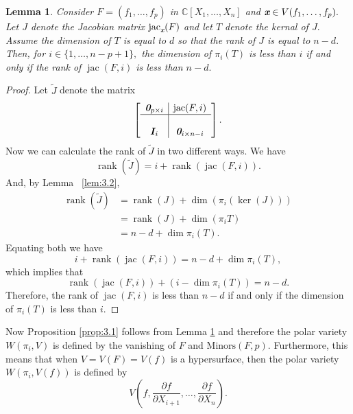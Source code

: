 \documentclass[a4paper]{article}
\def\bz{\textit{\textbf{0}}}
\def\xb{\textit{\textbf{x}}}
\def\jt{\widetilde{J}}
\DeclareMathOperator{\jac}{jac}
\DeclareMathOperator{\rank}{rank}
\def\minors{\textrm{Minors}(F,p)}
\def\pa{\partial}
\def\C{\mathbb{C}}
\def\Wi{W(\pi_i,V)}
\newtheorem{lemma}[theorem]{Lemma}
\begin{document}
%
%
\begin{lemma}\label{lem:3.3}
Consider $F=(f_1,\hdots,f_p)$ in $\C[X_1,\hdots,X_n]$ and $\xb \in V(f_1,\hdots,f_p).$ Let $J$ denote the Jacobian matrix $\jac_{\xb}( F)$ and let $T$ denote the kernal of $J.$ Assume the dimension of $T$ is equal to $d$ so that the rank of $J$ is equal to $n-d.$ Then, for $i \in \{1,\hdots,n-p+1\},$  the dimension of $\pi_i(T)$ is less than $i$ if and only if the rank of $\jac(F,i)$ is less than $n-d.$
\end{lemma} 
%
%
\begin{proof}
Let $\jt$ denote the matrix 
\[ 
\left[
\begin{array}{c|c}
\bz_{p \times i} & \jac(F,i)  \\
\hline \\
\bm I_i & \bz_{i \times n-i}  
\end{array}
\right].
\]
Now we can calculate the rank of $\jt$ in two different ways. We have 
\[
\rank(\jt) = i + \rank(\jac(F,i)).\] And, by Lemma ~\ref{lem:3.2}, 
\begin{align*}
    \rank(\jt) &= \rank(J) + \dim(\pi_i(\ker(J)))\\ 
    &= \rank(J) + \dim(\pi_iT) \\
    &= n-d + \dim \pi_i (T).
\end{align*}
Equating both we have \[
i + \rank(\jac(F,i)) = n-d + \dim\pi_i(T),
\]
which implies that 
\[
\rank(\jac(F,i)) + (i -\dim\pi_i (T) )= n-d.
\]
Therefore, the rank of $\jac(F,i)$ is less than $n-d$ if and only if the dimension of $\pi_i (T)$ is less than $i.$
\end{proof}
%
Now Proposition \ref{prop:3.1} follows from Lemma \ref{lem:3.3} and therefore the polar variety $\Wi$ is defined by the vanishing of $F$ and $\minors.$ Furthermore, this means that when $V=V(F)=V(f)$ is a hypersurface, then the polar variety $W(\pi_i,V(f))$ is defined by  
\[
V\left(f,\frac{\pa f}{\pa
  X_{i+1}},\hdots,\frac{\pa f}{\pa X_n}\right).
\] 
\end{document}
